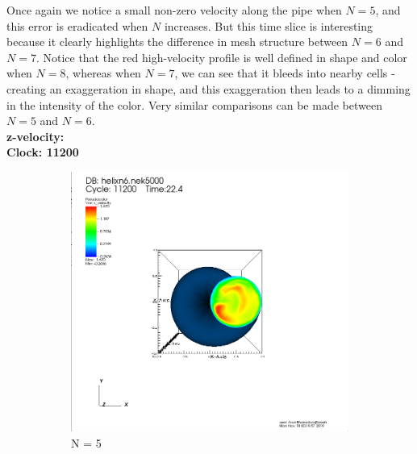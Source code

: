 \documentclass[12pt]{article}
\begin{document}
Once again we notice a small non-zero velocity along the pipe when $N = 5$, and this error is eradicated when $N$ increases. But this time slice is interesting because it clearly highlights the difference in mesh structure between $N=6$ and $N=7$. Notice that the red high-velocity profile is well defined in shape and color when $N = 8$, whereas when $N=7$, we can see that it bleeds into nearby cells - creating an exaggeration in shape, and this exaggeration then leads to a dimming in the intensity of the color. Very similar comparisons can be made between $N=5$ and $N=6$. \\
\noindent \textbf{z-velocity:}\\
\textbf{Clock: 11200}
\begin{figure}[h]
	\centering
	\begin{subfigure}[h]{0.400\textwidth}
		\centering
		\includegraphics[width=\textwidth]{z6c11200.png}
		\caption{N = 5}
	\end{subfigure}
	\begin{subfigure}[h]{0.400\textwidth}
		\centering

\end{subfigure}
\end{figure}
\end{document}
